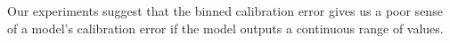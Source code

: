Our experiments suggest that the binned calibration error gives us a poor sense of a model's calibration error if the model outputs a continuous range of values.




